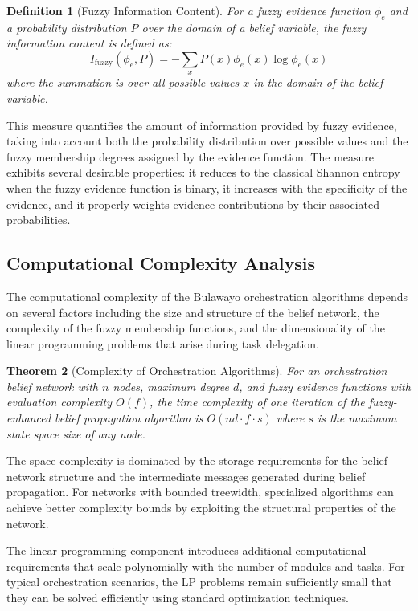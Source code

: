 \documentclass[12pt,a4paper]{article}
\newtheorem{theorem}{Theorem}[section]
\newtheorem{definition}[theorem]{Definition}
\begin{document}
\begin{definition}[Fuzzy Information Content]
For a fuzzy evidence function $\phi_e$ and a probability distribution $P$ over the domain of a belief variable, the fuzzy information content is defined as:
\begin{equation}
I_{\text{fuzzy}}(\phi_e, P) = -\sum_{x} P(x) \phi_e(x) \log \phi_e(x)
\end{equation}
where the summation is over all possible values $x$ in the domain of the belief variable.
\end{definition}

This measure quantifies the amount of information provided by fuzzy evidence, taking into account both the probability distribution over possible values and the fuzzy membership degrees assigned by the evidence function. The measure exhibits several desirable properties: it reduces to the classical Shannon entropy when the fuzzy evidence function is binary, it increases with the specificity of the evidence, and it properly weights evidence contributions by their associated probabilities.

\subsection{Computational Complexity Analysis}

The computational complexity of the Bulawayo orchestration algorithms depends on several factors including the size and structure of the belief network, the complexity of the fuzzy membership functions, and the dimensionality of the linear programming problems that arise during task delegation.

\begin{theorem}[Complexity of Orchestration Algorithms]
For an orchestration belief network with $n$ nodes, maximum degree $d$, and fuzzy evidence functions with evaluation complexity $O(f)$, the time complexity of one iteration of the fuzzy-enhanced belief propagation algorithm is $O(nd \cdot f \cdot s)$ where $s$ is the maximum state space size of any node.
\end{theorem}

The space complexity is dominated by the storage requirements for the belief network structure and the intermediate messages generated during belief propagation. For networks with bounded treewidth, specialized algorithms can achieve better complexity bounds by exploiting the structural properties of the network.

The linear programming component introduces additional computational requirements that scale polynomially with the number of modules and tasks. For typical orchestration scenarios, the LP problems remain sufficiently small that they can be solved efficiently using standard optimization techniques.
\end{document}
